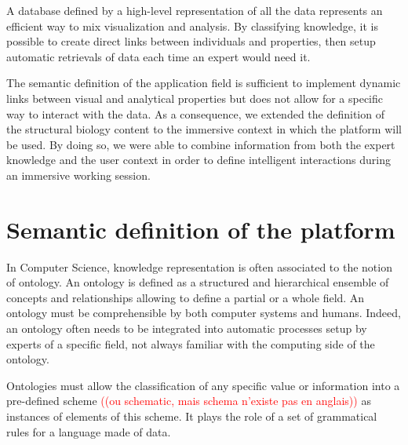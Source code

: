 \documentclass{vgtc}                          %
\newcommand*\mvb[1]{\textcolor{red}{#1}}
\begin{document}
A database defined by a high-level representation of all the data represents an efficient way to mix visualization and analysis. By classifying knowledge, it is possible to create direct links between individuals and properties, then setup automatic retrievals of data each time an expert would need it.

The semantic definition of the application field is sufficient to implement dynamic links between visual and analytical properties but does not allow for a specific way to interact with the data. As a consequence, we extended the definition of the structural biology content to the immersive context in which the platform will be used.
By doing so, we were able to combine information from both the expert knowledge and the user context in order to define intelligent interactions during an immersive working session.


\section{Semantic definition of the platform}

In Computer Science, knowledge representation is often associated to the notion of ontology. An ontology is defined as a structured and hierarchical ensemble of concepts and relationships allowing to define a partial or a whole field. An ontology must be comprehensible by both  computer systems and humans. Indeed, an ontology often needs to be integrated into automatic processes setup by experts of a specific field, not always familiar with the computing side of the ontology.

Ontologies must allow the classification of any specific value or information into a pre-defined scheme \mvb{((ou schematic, mais schema n'existe pas en anglais))} as instances of elements of this scheme. It plays the role of a set of grammatical rules for a language made of data.
\end{document}
